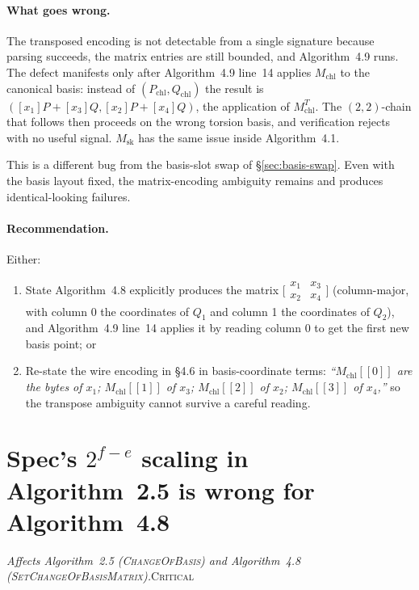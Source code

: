 \documentclass[a4paper,11pt]{article}
\newcommand{\algo}[1]{Algorithm~#1}
\newcommand{\critical}{\textsc{\color{BrickRed}Critical}}
\newcommand{\finding}[2]{\noindent\textit{#1}\hfill#2\par\smallskip}
\begin{document}
\paragraph{What goes wrong.} The transposed encoding is not detectable
from a single signature because parsing succeeds, the matrix entries
are still bounded, and \algo{4.9} runs.  The defect manifests only
after \algo{4.9} line~14 applies $M_{\mathrm{chl}}$ to the canonical
basis: instead of $(P_{\mathrm{chl}}, Q_{\mathrm{chl}})$ the result is
$([x_1] P + [x_3] Q, [x_2] P + [x_4] Q)$, the application of
$M_{\mathrm{chl}}^{T}$.  The $(2,2)$-chain that follows then proceeds
on the wrong torsion basis, and verification rejects with no useful
signal.  $M_{\mathrm{sk}}$ has the same issue inside \algo{4.1}.

This is a different bug from the basis-slot swap of
\S\ref{sec:basis-swap}.  Even with the basis layout fixed,
the matrix-encoding ambiguity remains and produces
identical-looking failures.

\paragraph{Recommendation.} Either:
\begin{enumerate}
\item State \algo{4.8} explicitly produces the matrix
$\bigl[\begin{smallmatrix} x_1 & x_3 \\ x_2 & x_4 \end{smallmatrix}\bigr]$
(column-major, with column 0 the coordinates of $Q_1$ and column 1 the
coordinates of $Q_2$), and \algo{4.9} line~14 applies it by reading
column 0 to get the first new basis point; or
\item Re-state the wire encoding in \S4.6 in basis-coordinate terms:
\emph{``$M_{\mathrm{chl}}[\![0]\!]$ are the bytes of $x_1$;
$M_{\mathrm{chl}}[\![1]\!]$ of $x_3$; $M_{\mathrm{chl}}[\![2]\!]$ of $x_2$;
$M_{\mathrm{chl}}[\![3]\!]$ of $x_4$,''} so the transpose ambiguity
cannot survive a careful reading.
\end{enumerate}

\section{Spec's $2^{f-e}$ scaling in \algo{2.5} is wrong for \algo{4.8}}
\label{sec:matrix-shift}

\finding{Affects \algo{2.5} (\textsc{ChangeOfBasis}) and
\algo{4.8} (\textsc{SetChangeOfBasisMatrix}).}{\critical}
\end{document}
